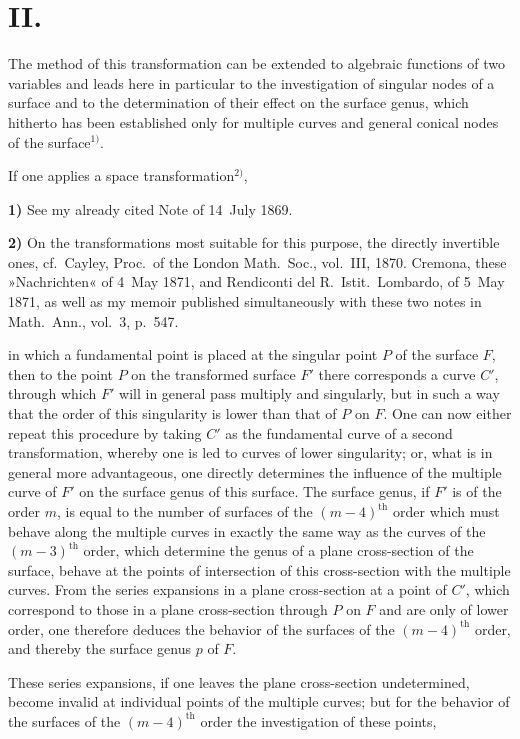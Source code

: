 \documentclass{article}
\begin{document}
\section*{II.}

The method of this transformation can be extended to algebraic functions of two variables and leads here in particular to the investigation of singular nodes of a surface and to the determination of their effect on the surface genus, which hitherto has been established only for multiple curves and general conical nodes of the surface${}^{1)}$.

If one applies a space transformation${}^{2)}$,

\textbf{1)} See my already cited Note of 14~July 1869.

\textbf{2)} On the transformations most suitable for this purpose, the directly invertible ones, cf.\ Cayley, Proc.\ of the London Math.\ Soc., vol.\ III, 1870.
Cremona, these »Nachrichten« of 4~May 1871, and Rendiconti del R.\ Istit.\ Lombardo, of 5~May 1871, as well as my memoir published simultaneously with these two notes in Math.\ Ann., vol.\ 3, p.\ 547.

in which a fundamental point is placed at the singular point $P$ of the surface $F$, then to the point $P$ on the transformed surface $F'$ there corresponds a curve $C'$, through which $F'$ will in general pass multiply and singularly, but in such a way that the order of this singularity is lower than that of $P$ on $F$. One can now either repeat this procedure by taking $C'$ as the fundamental curve of a second transformation, whereby one is led to curves of lower singularity; or, what is in general more advantageous, one directly determines the influence of the multiple curve of $F'$ on the surface genus of this surface. The surface genus, if $F'$ is of the order $m$, is equal to the number of surfaces of the $(m-4)^{\text{th}}$ order which must behave along the multiple curves in exactly the same way as the curves of the $(m-3)^{\text{th}}$ order, which determine the genus of a plane cross-section of the surface, behave at the points of intersection of this cross-section with the multiple curves. From the series expansions in a plane cross-section at a point of $C'$, which correspond to those in a plane cross-section through $P$ on $F$ and are only of lower order, one therefore deduces the behavior of the surfaces of the $(m-4)^{\text{th}}$ order, and thereby the surface genus $p$ of $F$.

These series expansions, if one leaves the plane cross-section undetermined, become invalid at individual points of the multiple curves; but for the behavior of the surfaces of the $(m-4)^{\text{th}}$ order the investigation of these points,
\end{document}
